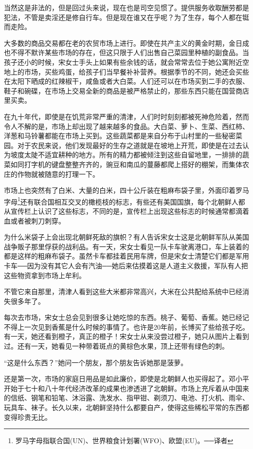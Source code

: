 当然这是非法的，但是回过头来说，现在也是司空见惯了。提供服务收取酬劳都是犯法，不管是卖淫还是修自行车。但是现在谁又在乎呢？为了生存，每个人都在铤而走险。

大多数的商品交易都在老的农贸市场上进行。即使在共产主义的黄金时期，金日成也不得不默许某些市场的存在，但这只限于人们出售自己菜园里种植的副食品。当孩子还小的时候，宋女士手头上如果有些余钱的话，就会常常去位于她公寓附近空地上的市场，买些鸡蛋，给孩子们当早餐补补营养。根据季节的不同，她还会买些在太阳下晒成的红辣椒干，咸鱼或者大白菜。人们还可以在市场买到二手的衣服、鞋子和碗碟，在市场上交易全新的商品是被严格禁止的，那些东西只能在国营商店里买卖。

在九十年代，即使是在饥荒非常严重的清津，人们时时刻刻都被死神危险着，然而令人不解的是，市场上却出现了越来越多的食品。大白菜、萝卜、生菜、西红柿、洋葱和马铃薯都能在市场上买到。这些蔬菜都是来自分布于山村里的一些秘密菜园。对于农民来说，他们发现最好的生存之道就是在坡地上开荒，即使是在过去认为坡度太陡不适宜耕种的地方。所有的精力都被倾注到这些自留地里，一排排的蔬菜如同打字机的键盘整整齐齐的，豌豆和南瓜的蔓藤都爬上搭好的棚架，而集体农庄的作物就被随意的打理一下。

市场上也突然有了白米、大量的白米，四十公斤装在粗麻布袋子里，外面印着罗马字母\footnote{罗马字母指联合国(UN)、世界粮食计划署(WFO)、欧盟(EU)。──译者}还有联合国相互交叉的橄榄枝的标志，有些还有美国国旗，每个北朝鲜人都从宣传栏上认识了这些标志，不同的是，宣传栏上出现这些标志的时候通常都滴着血或者被刺刀刺穿。

为什么米袋子上会出现北朝鲜死敌的旗帜？有人告诉宋女士这是北朝鲜军队从美国战争贩子那里俘获的战利品。有一天，宋女士看见一队卡车驶离港口，车上装着的都是这样的粗麻布袋子。虽然卡车都挂着民用车牌，但是宋女士清楚它们都是军用卡车──因为没有其它人会有汽油──她后来估摸着这是人道主义救援，军队有人把这些物资拿到市场上牟利。

不管它来自那里，清津人看到这些大米都非常高兴，大米在公共配给系统中已经消失很多年了。

每次去市场，宋女士总会见到很多让她吃惊的东西。桃子、葡萄、香蕉。她已经记不得上一次见到香蕉是什么时候的事情了。也许是20年前，长博买了些给孩子吃。有一天，她还看到橙子，真正的橙子！宋女士从来没尝过橙子，她只从图片上看到过。还有一天，她看见一种带着斑点的黄棕色水果，顶上还带有绿色的刺。

“这是什么东西？”她问一个朋友，那个朋友告诉她那是菠萝。

还是第一次，市场的家庭日用品是如此廉价，即使是北朝鲜人也买得起了。邓小平开始于七十和八十年代经济改革的成果也渗透进了北朝鲜。市场上充斥着从中国来的信纸、钢笔和铅笔、沐浴露、洗发水、指甲钳、剃须刀、电池、打火机、雨伞、玩具车、袜子。长久以来，北朝鲜坚持什么都要自产，使得这些稀松平常的东西都变得珍贵无比。

